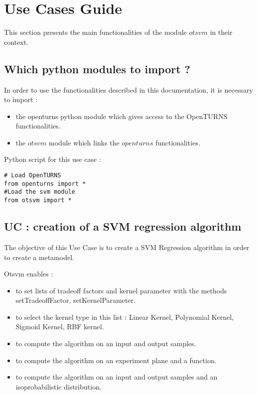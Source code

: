 % 




\section{Use Cases Guide}

This section presents the main functionalities of the module $otsvm$ in their context.



\subsection{Which python modules to import ?}

In order to use the functionalities described in this documentation, it is necessary to import  : 
\begin{itemize}
   \item the openturns python module which gives access to the OpenTURNS functionalities.
   \item the $otsvm$ module which links the $openturns$ functionalities.
\end{itemize}

Python  script for this use case :
\begin{lstlisting}
# Load OpenTURNS 
from openturns import *
#Load the svm module
from otsvm import *
\end{lstlisting}

\subsection{UC : creation of a SVM regression algorithm}

The objective of this Use Case is to create a SVM Regression algorithm in order to create a metamodel.


Otsvm enables :

\begin{itemize}
 \item to set lists of tradeoff factors and kernel parameter with the methods setTradeoffFactor, setKernelParameter.
 \item to select the kernel type in this list : Linear Kernel, Polynomial Kernel, Sigmoid Kernel, RBF kernel.
 \item to compute the algorithm on an input and output samples.
 \item to compute the algorithm on an experiment plane and a function.
 \item to compute the algorithm on an input and output samples and an isoprobabilistic distribution.
\end{itemize}

